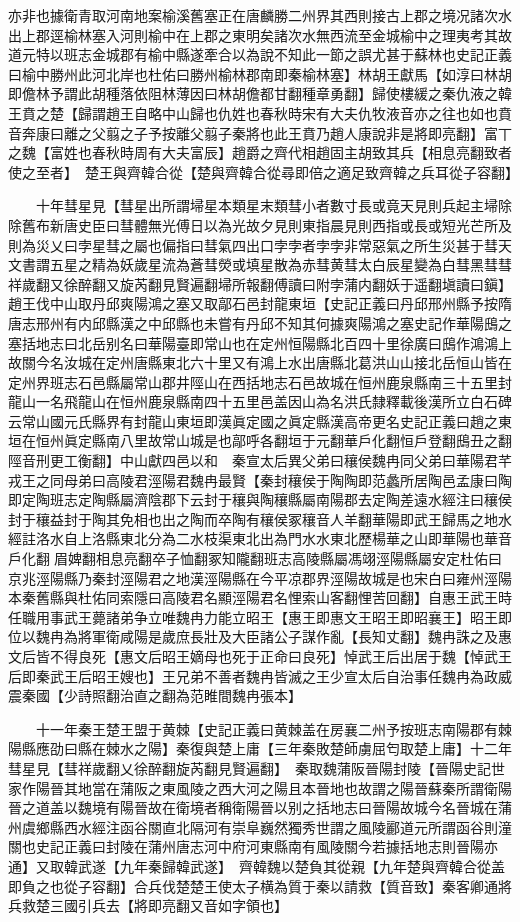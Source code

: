 亦非也據衛青取河南地案榆溪舊塞正在唐麟勝二州界其西則接古上郡之境况諸次水出上郡逕榆林塞入河則榆中在上郡之東明矣諸次水無西流至金城榆中之理夷考其故道元特以班志金城郡有榆中縣遂牽合以為說不知此一節之誤尤甚于蘇林也史記正義曰榆中勝州此河北岸也杜佑曰勝州榆林郡南即秦榆林塞】林胡王獻馬【如淳曰林胡即儋林予謂此胡種落依阻林薄因曰林胡儋都甘翻種章勇翻】歸使樓緩之秦仇液之韓王賁之楚【歸謂趙王自略中山歸也仇姓也春秋時宋有大夫仇牧液音亦之往也如也賁音奔康曰離之父翦之子予按離父翦子秦將也此王賁乃趙人康說非是將即亮翻】富丅之魏【富姓也春秋時周有大夫富辰】趙爵之齊代相趙固主胡致其兵【相息亮翻致者使之至者】　楚王與齊韓合從【楚與齊韓合從尋即倍之適足致齊韓之兵耳從子容翻】

　　十年彗星見【彗星出所謂埽星本類星末類彗小者數寸長或竟天見則兵起主埽除除舊布新唐史臣曰彗體無光傅日以為光故夕見則東指晨見則西指或長或短光芒所及則為災乂曰孛星彗之屬也偏指曰彗氣四出口孛孛者孛孛非常惡氣之所生災甚于彗天文書謂五星之精為妖歲星流為蒼彗熒或填星散為赤彗黄彗太白辰星變為白彗黑彗彗祥歲翻又徐醉翻又旋芮翻見賢遍翻埽所報翻傅讀曰附孛蒲内翻妖于遥翻塡讀曰鎭】　趙王伐中山取丹邱爽陽鴻之塞又取鄗石邑封龍東垣【史記正義曰丹邱邢州縣予按隋唐志邢州有内邱縣漢之中邱縣也未嘗有丹邱不知其何據爽陽鴻之塞史記作華陽䲭之塞括地志曰北岳别名曰華陽臺即常山也在定州恒陽縣北百四十里徐廣曰䲭作鴻鴻上故關今名汝城在定州唐縣東北六十里又有鴻上水出唐縣北葛洪山山接北岳恒山皆在定州界班志石邑縣屬常山郡井陘山在西括地志石邑故城在恒州鹿泉縣南三十五里封龍山一名飛龍山在恒州鹿泉縣南四十五里邑盖因山為名洪氏隸釋載後漢所立白石碑云常山國元氏縣界有封龍山東垣即漢眞定國之眞定縣漢高帝更名史記正義曰趙之東垣在恒州眞定縣南八里故常山城是也鄗呼各翻垣于元翻華戶化翻恒戶登翻䲭丑之翻陘音刑更工衡翻】中山獻四邑以和　秦宣太后異父弟曰穰侯魏冉同父弟曰華陽君芊戎王之同母弟曰高陵君涇陽君魏冉最賢【秦封穰侯于陶陶即范蠡所居陶邑孟康曰陶即定陶班志定陶縣屬濟陰郡下云封于穰與陶穰縣屬南陽郡去定陶差遠水經注曰穰侯封于穰益封于陶其免相也出之陶而卒陶有穰侯冢穰音人羊翻華陽即武王歸馬之地水經註洛水自上洛縣東北分為二水枝渠東北出為門水水東北歷楊華之山即華陽也華音戶化翻眉婢翻相息亮翻卒子恤翻冢知隴翻班志高陵縣屬馮翊涇陽縣屬安定杜佑曰京兆涇陽縣乃秦封涇陽君之地漢涇陽縣在今平凉郡界涇陽故城是也宋白曰雍州涇陽本秦舊縣與杜佑同索隱曰高陵君名顯涇陽君名悝索山客翻悝苦回翻】自惠王武王時任職用事武王薨諸弟争立唯魏冉力能立昭王【惠王即惠文王昭王即昭襄王】昭王即位以魏冉為將軍衛咸陽是歲庶長壯及大臣諸公子謀作亂【長知丈翻】魏冉誅之及惠文后皆不得良死【惠文后昭王嫡母也死于正命曰良死】悼武王后出居于魏【悼武王后即秦武王后昭王嫂也】王兄弟不善者魏冉皆滅之王少宣太后自治事任魏冉為政威震秦國【少詩照翻治直之翻為范睢間魏冉張本】

　　十一年秦王楚王盟于黄棘【史記正義曰黄棘盖在房襄二州予按班志南陽郡有棘陽縣應劭曰縣在棘水之陽】秦復與楚上庸【三年秦敗楚師虜屈匄取楚上庸】十二年彗星見【彗祥歲翻乂徐醉翻旋芮翻見賢遍翻】　秦取魏蒲阪晉陽封陵【晉陽史記世家作陽晉其地當在蒲阪之東風陵之西大河之陽且本晉地也故謂之陽晉蘇秦所謂衛陽晉之道盖以魏境有陽晉故在衛境者稱衛陽晉以别之括地志曰晉陽故城今名晉城在蒲州虞鄉縣西水經注函谷關直北隔河有崇阜巍然獨秀世謂之風陵酈道元所謂函谷則潼關也史記正義曰封陵在蒲州唐志河中府河東縣南有風陵關今若據括地志則晉陽亦通】又取韓武遂【九年秦歸韓武遂】　齊韓魏以楚負其從親【九年楚與齊韓合從盖即負之也從子容翻】合兵伐楚楚王使太子横為質于秦以請救【質音致】秦客卿通將兵救楚三國引兵去【將即亮翻又音如字領也】

